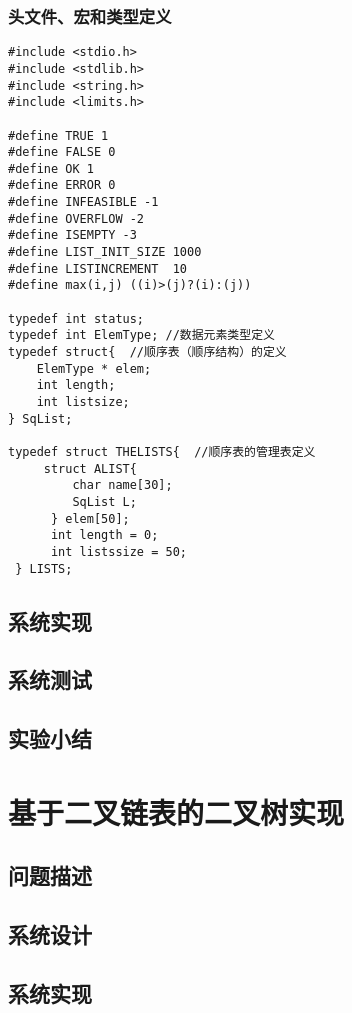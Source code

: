 \documentclass[supercite]{Experimental_Report}
\theoremstyle{definition}
\begin{document}
\subsubsection{头文件、宏和类型定义}
\begin{lstlisting}
#include <stdio.h>
#include <stdlib.h>
#include <string.h>
#include <limits.h>

#define TRUE 1
#define FALSE 0
#define OK 1
#define ERROR 0
#define INFEASIBLE -1
#define OVERFLOW -2
#define ISEMPTY -3
#define LIST_INIT_SIZE 1000
#define LISTINCREMENT  10
#define max(i,j) ((i)>(j)?(i):(j))

typedef int status;
typedef int ElemType; //数据元素类型定义
typedef struct{  //顺序表（顺序结构）的定义
    ElemType * elem;
    int length;
    int listsize;
} SqList;

typedef struct THELISTS{  //顺序表的管理表定义
	 struct ALIST{
		 char name[30];
		 SqList L;
	  } elem[50];
	  int length = 0;
	  int listssize = 50;
 } LISTS;
\end{lstlisting}

\subsection{系统实现}


\subsection{系统测试}


\subsection{实验小结}

\newpage

\section{基于二叉链表的二叉树实现}


\subsection{问题描述}


\subsection{系统设计}


\subsection{系统实现}
\end{document}
